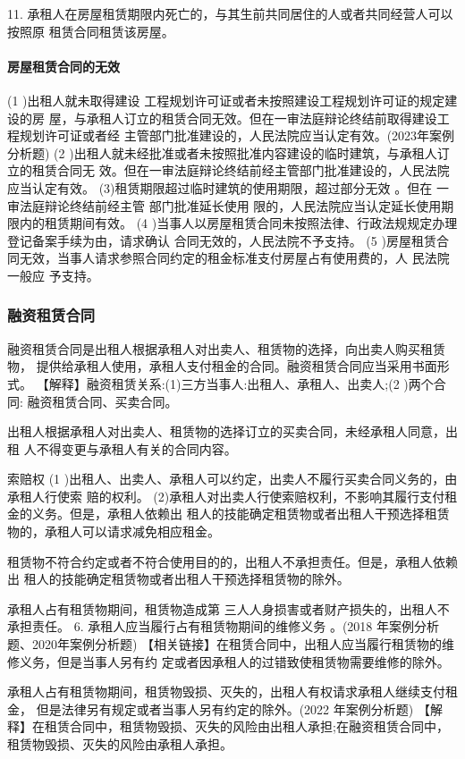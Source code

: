 \documentclass[UTF8,12pt]{ctexart}
\numberwithin{equation}{section} %
\numberwithin{figure}{section}
\numberwithin{table}{section}
\begin{document}
	
	11. 承租人在房屋租赁期限内死亡的，与其生前共同居住的人或者共同经营人可以按照原 租赁合同租赁该房屋。
	
	\paragraph{房屋租赁合同的无效}
	(1 )出租人就未取得建设 工程规划许可证或者未按照建设工程规划许可证的规定建设的房 屋，与承租人订立的租赁合同无效。但在一审法庭辩论终结前取得建设工程规划许可证或者经 主管部门批准建设的，人民法院应当认定有效。(2023年案例分析题)
	(2 )出租人就未经批准或者未按照批准内容建设的临时建筑，与承租人订立的租赁合同无 效。但在一审法庭辩论终结前经主管部门批准建设的，人民法院应当认定有效。
	(3)租赁期限超过临时建筑的使用期限，超过部分无效 。但在 一审法庭辩论终结前经主管 部门批准延长使用 限的，人民法院应当认定延长使用期限内的租赁期间有效。
	(4 )当事人以房屋租赁合同未按照法律、行政法规规定办理登记备案手续为由，请求确认 合同无效的，人民法院不予支持。
	(5 )房屋租赁合同无效，当事人请求参照合同约定的租金标准支付房屋占有使用费的，人 民法院一般应 予支持。
	
	
	\subsubsection{融资租赁合同}
	
	融资租赁合同是出租人根据承租人对出卖人、租赁物的选择，向出卖人购买租赁物， 提供给承租人使用，承租人支付租金的合同。融资租赁合同应当采用书面形式。
	【解释】融资租赁关系:(1)三方当事人:出租人、承租人、出卖人;(2 )两个合同: 融资租赁合同、买卖合同。
	
	 出租人根据承租人对出卖人、租赁物的选择订立的买卖合同，未经承租人同意，出租 人不得变更与承租人有关的合同内容。
	
	索赔权
	(1 )出租人、出卖人、承租人可以约定，出卖人不履行买卖合同义务的，由承租人行使索 赔的权利。 (2)承租人对出卖人行使索赔权利，不影响其履行支付租金的义务。但是，承租人依赖出 租人的技能确定租赁物或者出租人干预选择租赁物的，承租人可以请求减免相应租金。
	
	
	租赁物不符合约定或者不符合使用目的的，出租人不承担责任。但是，承租人依赖出 租人的技能确定租赁物或者出租人干预选择租赁物的除外。
	
	承租人占有租赁物期间，租赁物造成第 三人人身损害或者财产损失的，出租人不承担责任。 6. 承租人应当履行占有租赁物期间的维修义务 。(2018 年案例分析题、2020年案例分析题)
	【相关链接】在租赁合同中，出租人应当履行租赁物的维修义务，但是当事人另有约 定或者因承租人的过错致使租赁物需要维修的除外。
	
	承租人占有租赁物期间，租赁物毁损、灭失的，出租人有权请求承租人继续支付租金， 但是法律另有规定或者当事人另有约定的除外。(2022 年案例分析题)
	【解释】在租赁合同中，租赁物毁损、灭失的风险由出租人承担;在融资租赁合同中， 租赁物毁损、灭失的风险由承租人承担。
	
\end{document}
